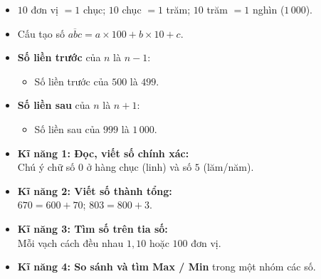 \documentclass[10pt,a4paper]{article}
\begin{document}
\noindent
\begin{minipage}[t]{0.49\textwidth}\vspace{0pt}
\begin{tcolorbox}[
  enhanced,
  colback=violet!4!white,
  colframe=violet!75!black,
  arc=2mm, boxrule=0.8pt,
  left=2mm, right=2mm, top=1.8mm, bottom=1.8mm,
  title={\footnotesize\bfseries\color{white}\faKey\ 1. Hệ thống hóa cấu tạo số đến 1000}
]
{\footnotesize
\begin{itemize}\setlength{\itemsep}{1pt}\setlength{\leftskip}{-2.5mm}
  \item $10$ đơn vị $= 1$ chục; $10$ chục $= 1$ trăm; $10$ trăm $= 1$ nghìn ($1\,000$).
  \item Cấu tạo số $\overline{abc} = a \times 100 + b \times 10 + c$.
  \item \textbf{Số liền trước} của $n$ là $n - 1$:
  \begin{itemize}\setlength{\itemsep}{0.5pt}\setlength{\leftskip}{-2mm}
    \item Số liền trước của $500$ là $499$.
  \end{itemize}
  \item \textbf{Số liền sau} của $n$ là $n + 1$:
  \begin{itemize}\setlength{\itemsep}{0.5pt}\setlength{\leftskip}{-2mm}
    \item Số liền sau của $999$ là $1\,000$.
  \end{itemize}
\end{itemize}
}
\end{tcolorbox}
\end{minipage}
\hfill
\begin{minipage}[t]{0.49\textwidth}\vspace{0pt}
\begin{tcolorbox}[
  enhanced,
  colback=teal!4!white,
  colframe=teal!75!black,
  arc=2mm, boxrule=0.8pt,
  left=2mm, right=2mm, top=1.8mm, bottom=1.8mm,
  title={\footnotesize\bfseries\color{white}\faSliders\ 2. Kĩ năng trọng tâm cần nắm vững}
]
{\footnotesize
\begin{itemize}\setlength{\itemsep}{1pt}\setlength{\leftskip}{-2.5mm}
  \item \textbf{Kĩ năng 1: Đọc, viết số chính xác:}\\
  Chú ý chữ số $0$ ở hàng chục (linh) và số $5$ (lăm/năm).
  \item \textbf{Kĩ năng 2: Viết số thành tổng:}\\
  $670 = 600 + 70$; $803 = 800 + 3$.
  \item \textbf{Kĩ năng 3: Tìm số trên tia số:}\\
  Mỗi vạch cách đều nhau $1, 10$ hoặc $100$ đơn vị.
  \item \textbf{Kĩ năng 4: So sánh và tìm Max / Min} trong một nhóm các số.
\end{itemize}
}
\end{tcolorbox}
\end{minipage}
\end{document}
